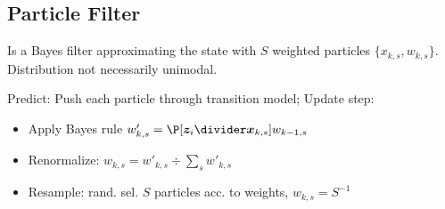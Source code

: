 \subsection{Particle Filter}
Is a Bayes filter approximating the state with $S$ weighted particles $\{ x_{k, s}, w_{k, s} \}$. Distribution not necessarily unimodal.

Predict: Push each particle through transition model; Update step:
\begin{itemize}
    \item Apply Bayes rule $w'_{k, s} = \P[\vec{z}_i \divider \vec{x}_{k, s}] w_{k - 1, s}$
    \item Renormalize: $w_{k, s} = w'_{k, s} \div \sum_{s} w'_{k, s}$
    \item Resample: rand. sel. $S$ particles acc. to weights, $w_{k, s} = S^{-1}$
\end{itemize}
